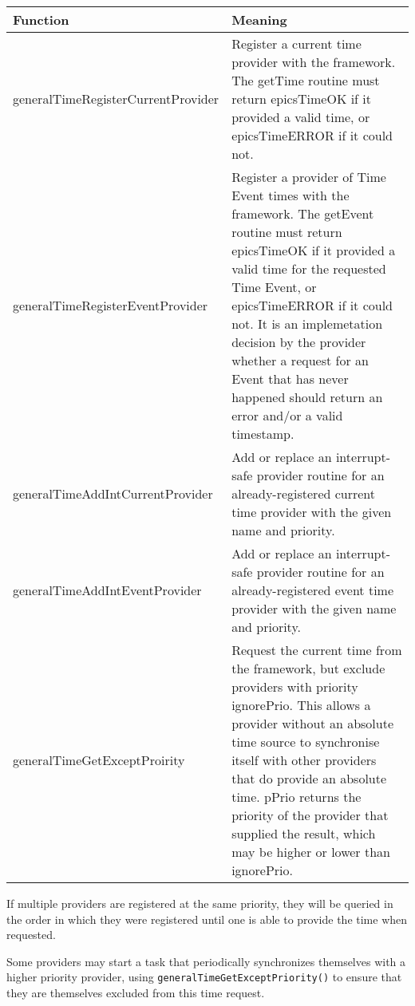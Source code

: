 \begin{center}
\begin{longtable}{p{2.125in}p{4.125in}}
\textbf{Function} & \textbf{Meaning}\\
\hline
generalTimeRegisterCurrentProvider &
Register a current time provider with the framework.
The getTime routine must return epicsTimeOK if it provided a valid time, or epicsTimeERROR if it could not.\\

generalTimeRegisterEventProvider &
Register a provider of Time Event times with the framework.
The getEvent routine must return epicsTimeOK if it provided a valid time for the requested Time Event, or epicsTimeERROR if it could not.
It is an implemetation decision by the provider whether a request for an Event that has never happened should return an error and/or a valid timestamp.\\

generalTimeAddIntCurrentProvider &
Add or replace an interrupt-safe provider routine for an already-registered current time provider with the given name and priority.\\

generalTimeAddIntEventProvider &
Add or replace an interrupt-safe provider routine for an already-registered event time provider with the given name and priority.\\

generalTimeGetExceptProirity &
Request the current time from the framework, but exclude providers with priority ignorePrio.
This allows a provider without an absolute time source to synchronise itself with other providers that do provide an absolute time.
pPrio returns the priority of the provider that supplied the result, which may be higher or lower than ignorePrio.
\end{longtable}

\end{center}


If multiple providers are registered at the same priority, they will be queried in the order in which they were registered 
until one is able to provide the time when requested.

Some providers may start a task that periodically synchronizes themselves with a higher priority provider, using 
\verb|generalTimeGetExceptPriority()| to ensure that they are themselves excluded from this time request.

